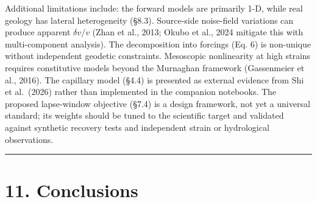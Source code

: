 \documentclass[draft]{agujournal2019}
\begin{document}
Additional limitations include: the forward models are primarily 1-D,
while real geology has lateral heterogeneity (§8.3). Source-side
noise-field variations can produce apparent \(\delta v/v\) (Zhan et al.,
2013; Okubo et al., 2024 mitigate this with multi-component analysis).
The decomposition into forcings (Eq. 6) is non-unique without
independent geodetic constraints. Mesoscopic nonlinearity at high
strains requires constitutive models beyond the Murnaghan framework
(Gassenmeier et al., 2016). The capillary model (§4.4) is presented as
external evidence from Shi et al.~(2026) rather than implemented in the
companion notebooks. The proposed lapse-window objective (§7.4) is a
design framework, not yet a universal standard; its weights should be
tuned to the scientific target and validated against synthetic recovery
tests and independent strain or hydrological observations.

\begin{center}\rule{0.5\linewidth}{0.5pt}\end{center}

\section{11. Conclusions}\label{conclusions}
\end{document}
